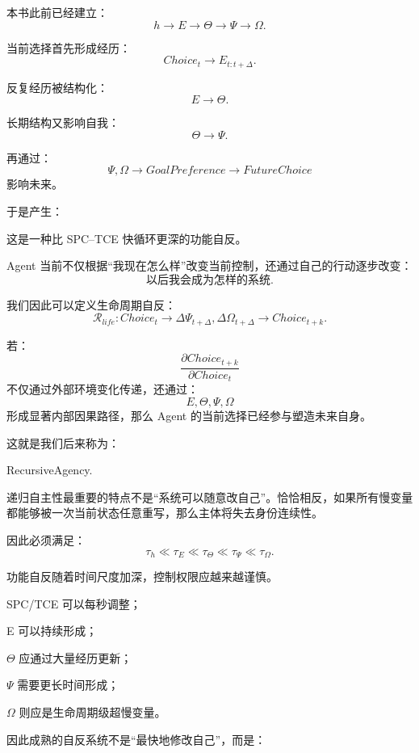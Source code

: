 本书此前已经建立：
\[
h
\rightarrow
E
\rightarrow
\Theta
\rightarrow
\Psi
\rightarrow
\Omega.
\]

当前选择首先形成经历：
\[
Choice_t
\rightarrow
E_{t:t+\Delta}.
\]

反复经历被结构化：
\[
E
\rightarrow
\Theta.
\]

长期结构又影响自我：
\[
\Theta
\rightarrow
\Psi.
\]

再通过：
\[
\Psi,\Omega
\rightarrow
GoalPreference
\rightarrow
FutureChoice
\]
影响未来。

于是产生：
\begin{statementbox}
\centering
{}
\end{statementbox}

这是一种比 SPC--TCE 快循环更深的功能自反。

Agent 当前不仅根据“我现在怎么样”改变当前控制，还通过自己的行动逐步改变：
\[
\text{以后我会成为怎样的系统}.
\]

我们因此可以定义生命周期自反：
\[
\mathcal R_{life}
:
Choice_t
\rightarrow
\Delta\Psi_{t+\Delta}
,\Delta\Omega_{t+\Delta}
\rightarrow
Choice_{t+k}.
\]

若：
\[
\frac{\partial Choice_{t+k}}
{\partial Choice_t}
\]
不仅通过外部环境变化传递，还通过：
\[
E,\Theta,\Psi,\Omega
\]
形成显著内部因果路径，那么 Agent 的当前选择已经参与塑造未来自身。

这就是我们后来称为：
\begin{statementbox}
RecursiveAgency.
\end{statementbox}

递归自主性最重要的特点不是“系统可以随意改自己”。恰恰相反，如果所有慢变量都能够被一次当前状态任意重写，那么主体将失去身份连续性。

因此必须满足：
\[
\boxed{
\tau_h
\ll
\tau_E
\ll
\tau_\Theta
\ll
\tau_\Psi
\ll
\tau_\Omega.
}
\]

功能自反随着时间尺度加深，控制权限应越来越谨慎。

SPC/TCE 可以每秒调整；

E 可以持续形成；

\(\Theta\) 应通过大量经历更新；

\(\Psi\) 需要更长时间形成；

\(\Omega\) 则应是生命周期级超慢变量。

因此成熟的自反系统不是“最快地修改自己”，而是：
\begin{statementbox}
\centering
{}
\end{statementbox}

